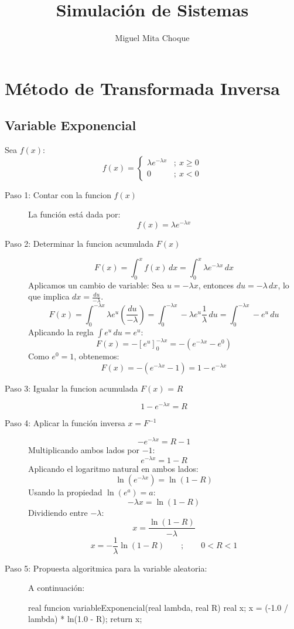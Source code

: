 \documentclass{article}
\begin{document}
\title{Simulación de Sistemas}
\author{Miguel Mita Choque}
\maketitle
\section{Método de Transformada Inversa}
\subsection{Variable Exponencial}
Sea $f(x)$:
$$f(x)=\begin{cases}\lambda e^{-\lambda x} &;\ x \geq 0 \\0 &;\ x < 0\end{cases}$$
\begin{description}
    \item[Paso 1: Contar con la funcion $f(x)$]
    La función está dada por:
    $$ f(x)=\lambda e^{-\lambda x} $$
    \item[Paso 2: Determinar la funcion acumulada $F(x)$]
    $$ F(x)=\int_0^x f(x)\,dx= \int_0^x \lambda e^{-\lambda x}\, dx $$
    Aplicamos un cambio de variable: Sea $u = -\lambda x$, entonces $du = -\lambda\, dx$, lo que implica $dx = \frac{du}{-\lambda}$.
    $$ F(x) = \int_0^{-\lambda x} \lambda e^u \left( \frac{du}{-\lambda} \right) = \int_0^{-\lambda x} -\lambda e^u \frac{1}{\lambda} \, du = \int_0^{-\lambda x} -e^u \, du $$
    Aplicando la regla $\int e^u \, du = e^u$:
    $$ F(x) = - \left[ e^u \right]_0^{-\lambda x} = - (e^{-\lambda x} - e^0) $$
    Como $e^0 = 1$, obtenemos:
    $$ F(x) = - (e^{-\lambda x} - 1) = 1 - e^{-\lambda x} $$
    \item[Paso 3: Igualar la funcion acumulada $F(x)$ = $R$]
    $$ 1 - e^{-\lambda x} = R $$
    
    \item[Paso 4: Aplicar la función inversa $x=F^{-1}$]
    $$ -e^{-\lambda x} = R - 1 $$
    Multiplicando ambos lados por $-1$:
    $$ e^{-\lambda x} = 1 - R $$
    Aplicando el logaritmo natural en ambos lados:
    $$ \ln(e^{-\lambda x}) = \ln(1 - R) $$
    Usando la propiedad $\ln(e^a) = a$:
    $$ -\lambda x = \ln(1 - R) $$
    Dividiendo entre $-\lambda$:
    $$ x = \frac{\ln(1 - R)}{-\lambda} $$
    $$ x = -\frac{1}{\lambda} \ln(1 - R) \qquad ; \qquad 0 < R < 1 $$
    
    \item[Paso 5: Propuesta algoritmica para la variable aleatoria:]
    A continuación:
    
    \begin{Algoritmo}{}
real funcion variableExponencial(real lambda, real R){
    real x;
    x = (-1.0 / lambda) * ln(1.0 - R);
    return x;
}
    \end{Algoritmo}
\end{description}
\end{document}

